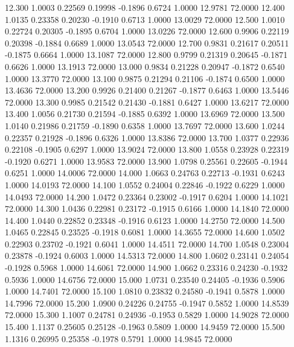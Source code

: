   12.300   1.0003   0.22569   0.19998  -0.1896   0.6724   1.0000  12.9781  72.0000
  12.400   1.0135   0.23358   0.20230  -0.1910   0.6713   1.0000  13.0029  72.0000
  12.500   1.0010   0.22724   0.20305  -0.1895   0.6704   1.0000  13.0226  72.0000
  12.600   0.9906   0.22119   0.20398  -0.1884   0.6689   1.0000  13.0543  72.0000
  12.700   0.9831   0.21617   0.20511  -0.1875   0.6664   1.0000  13.1087  72.0000
  12.800   0.9799   0.21319   0.20645  -0.1871   0.6626   1.0000  13.1913  72.0000
  13.000   0.9834   0.21228   0.20947  -0.1872   0.6540   1.0000  13.3770  72.0000
  13.100   0.9875   0.21294   0.21106  -0.1874   0.6500   1.0000  13.4636  72.0000
  13.200   0.9926   0.21400   0.21267  -0.1877   0.6463   1.0000  13.5446  72.0000
  13.300   0.9985   0.21542   0.21430  -0.1881   0.6427   1.0000  13.6217  72.0000
  13.400   1.0056   0.21730   0.21594  -0.1885   0.6392   1.0000  13.6969  72.0000
  13.500   1.0140   0.21986   0.21759  -0.1890   0.6358   1.0000  13.7697  72.0000
  13.600   1.0244   0.22357   0.21928  -0.1896   0.6326   1.0000  13.8386  72.0000
  13.700   1.0377   0.22936   0.22108  -0.1905   0.6297   1.0000  13.9024  72.0000
  13.800   1.0558   0.23928   0.22319  -0.1920   0.6271   1.0000  13.9583  72.0000
  13.900   1.0798   0.25561   0.22605  -0.1944   0.6251   1.0000  14.0006  72.0000
  14.000   1.0663   0.24763   0.22713  -0.1931   0.6243   1.0000  14.0193  72.0000
  14.100   1.0552   0.24004   0.22846  -0.1922   0.6229   1.0000  14.0493  72.0000
  14.200   1.0472   0.23364   0.23002  -0.1917   0.6204   1.0000  14.1021  72.0000
  14.300   1.0436   0.22981   0.23172  -0.1915   0.6166   1.0000  14.1840  72.0000
  14.400   1.0440   0.22852   0.23348  -0.1916   0.6123   1.0000  14.2750  72.0000
  14.500   1.0465   0.22845   0.23525  -0.1918   0.6081   1.0000  14.3655  72.0000
  14.600   1.0502   0.22903   0.23702  -0.1921   0.6041   1.0000  14.4511  72.0000
  14.700   1.0548   0.23004   0.23878  -0.1924   0.6003   1.0000  14.5313  72.0000
  14.800   1.0602   0.23141   0.24054  -0.1928   0.5968   1.0000  14.6061  72.0000
  14.900   1.0662   0.23316   0.24230  -0.1932   0.5936   1.0000  14.6756  72.0000
  15.000   1.0731   0.23540   0.24405  -0.1936   0.5906   1.0000  14.7401  72.0000
  15.100   1.0810   0.23832   0.24580  -0.1941   0.5878   1.0000  14.7996  72.0000
  15.200   1.0900   0.24226   0.24755  -0.1947   0.5852   1.0000  14.8539  72.0000
  15.300   1.1007   0.24781   0.24936  -0.1953   0.5829   1.0000  14.9028  72.0000
  15.400   1.1137   0.25605   0.25128  -0.1963   0.5809   1.0000  14.9459  72.0000
  15.500   1.1316   0.26995   0.25358  -0.1978   0.5791   1.0000  14.9845  72.0000
